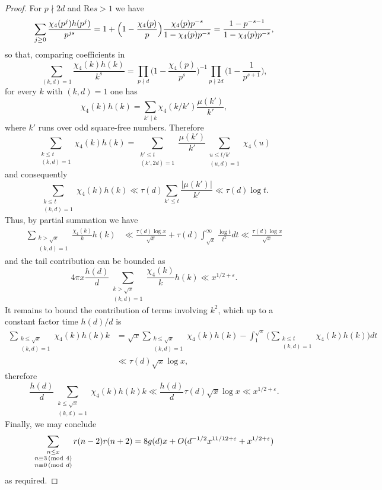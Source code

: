 \documentclass[12pt]{amsart}
\theoremstyle{remark}
\renewcommand{\pmod}[1]{\mkern3mu(\mathrm{mod}\ #1)}
\begin{document}
\begin{proof}
    For $p \nmid 2d$ and $\text{Re} s > 1$ we have
    \[
        \sum_{j \ge 0} \frac{\chi_4(p^j)h(p^j)}{p^{js}}
        = 1 + \Bigl(1-\frac{\chi_4(p)}{p}\Bigr)\frac{\chi_4(p)p^{-s}}{1-\chi_4(p)p^{-s}}
        = \frac{1-p^{-s-1}}{1-\chi_4(p)p^{-s}},
    \]
    so that, comparing coefficients in
    \[
        \sum_{(k,d) = 1}\frac{\chi_4(k)h(k)}{k^{s}}
     = \prod_{p \nmid d}\biggl(1-\frac{\chi_4(p)}{p^{s}} \biggr)^{-1} \prod_{p \nmid 2d}\biggl(1-\frac{1}{p^{s+1}}\biggr),
    \]
    for every $k$ with $(k,d)=1$ one has
    \[
        \chi_4(k) h(k) = \sum_{k' \mid k} \chi_4(k/k') \frac{\mu(k')}{k'},
    \]
    where $k'$ runs over odd square-free numbers.
    Therefore
    \[
        \sum_{\substack{k \le t \\ (k,d)=1}} \chi_4(k) h(k) = \sum_{\substack{k' \le t \\ (k', 2d)=1}} \frac{\mu(k')}{k'} \sum_{\substack{u \le t/k'\\ (u,d)=1}} \chi_4(u)
    \]
    and consequently
    \[
        \sum_{\substack{k \le t \\ (k,d)=1}} \chi_4(k) h(k) \ll \tau(d) \sum_{k' \le t} \frac{|\mu(k')|}{k'} \ll \tau(d) \log t.
    \]
    Thus, by partial summation we have
    \[
        \begin{split}
            \sum_{\substack{k > \sqrt{x} \\ (k,d)=1}} \frac{\chi_4(k)}{k} h(k) &\ll \frac{\tau(d) \log x}{\sqrt{x}} + \tau(d) \int_{\sqrt{x}}^{\infty} \frac{\log t}{t^2} dt \ll \frac{\tau(d) \log x}{\sqrt{x}}
        \end{split} 
    \]
    and the tail contribution can be bounded as
    \[
        4 \pi x \frac{h(d)}{d} \sum_{\substack{k > \sqrt{x} \\ (k,d)=1}} \frac{\chi_4(k)}{k} h(k) \ll x^{1/2 + \varepsilon}.
    \]
    It remains to bound the contribution of terms involving $k^2$, which up to a constant factor time $h(d)/d$ is
    \[
        \begin{split}
            \sum_{\substack{k \le \sqrt{x} \\ (k,d)=1}} \chi_4(k) h(k) k &= \sqrt{x} \sum_{\substack{k \le \sqrt{x} \\ (k,d)=1}} \chi_4(k) h(k)
            -   \int_1^{\sqrt{x}} \biggl( \sum_{\substack{k \le t \\ (k,d)=1}} \chi_4(k) h(k) \biggr) dt\\
            &\ll \tau(d) \sqrt{x} \log x,
        \end{split} 
    \]
    therefore
    \[
         \frac{h(d)}{d} \sum_{\substack{k \le \sqrt{x} \\ (k,d)=1}} \chi_4(k) h(k) k \ll \frac{h(d)}{d} \tau(d) \sqrt{x} \log x \ll  x^{1/2 + \varepsilon}.
    \]
    Finally, we may conclude
    \[
            \sum_{\substack{ n \le x\\ n \equiv 3 \pmod 4\\ n \equiv 0 \pmod d}} r(n-2)r(n+2) = 8 g(d) x
            + O(d^{-1/2} x^{11/12+\varepsilon} + x^{1/2+\varepsilon})
    \]
    as required.
\end{proof}
\end{document}
